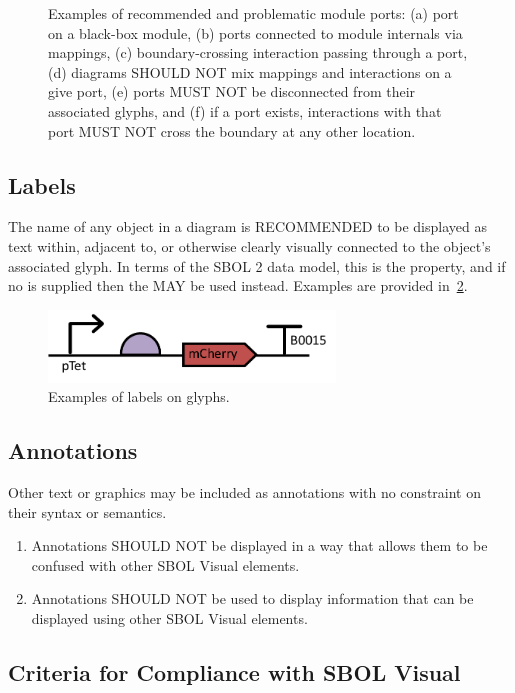 \begin{enumerate}
\begin{figure}[h!]
	\caption{Examples of recommended and problematic module ports: (a) port on a black-box module, (b) ports connected to module internals via mappings, (c) boundary-crossing interaction passing through a port, (d) diagrams SHOULD NOT mix mappings and interactions on a give port, (e) ports MUST NOT be disconnected from their associated glyphs, and (f) if a port exists, interactions with that port MUST NOT cross the boundary at any other location.}
	\label{exa:moduleD}
	\end{figure}

\end{enumerate}

\subsection{Labels}
The name of any object in a diagram is RECOMMENDED to be displayed as text within, adjacent to, or otherwise clearly visually connected to the object's associated glyph.  In terms of the SBOL 2 data model, this is the  property, and if no  is supplied then the  MAY be used instead.
Examples are provided in~\ref{exa:5}.

	\begin{figure}[h!]
	\centering
	\includegraphics[width=3in]{figures/examples/5-labels.pdf}
	\caption{Examples of labels on glyphs.}
	\label{exa:5}
	\end{figure}


\subsection{Annotations}
Other text or graphics may be included as annotations with no constraint on their syntax or semantics.

\begin{enumerate}
\item Annotations SHOULD NOT be displayed in a way that allows them to be confused with other SBOL Visual elements.
\item Annotations SHOULD NOT be used to display information that can be displayed using other SBOL Visual elements.
\end{enumerate}

\subsection{Criteria for Compliance with SBOL Visual}

